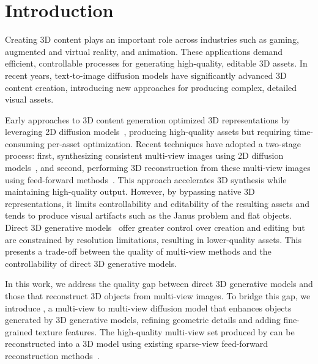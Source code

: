 \chapter{Introduction}
\label{chap:intro}


Creating 3D content plays an important role across industries such as gaming, augmented and virtual reality, and animation. These applications demand efficient, controllable processes for generating high-quality, editable 3D assets. In recent years, text-to-image diffusion models have significantly advanced 3D content creation, introducing new approaches for producing complex, detailed visual assets.

Early approaches to 3D content generation optimized 3D representations by leveraging 2D diffusion models~\cite{poole2022dreamfusion, wang2022scorejacobianchaininglifting}, producing high-quality assets but requiring time-consuming per-asset optimization. Recent techniques have adopted a two-stage process: first, synthesizing consistent multi-view images using 2D diffusion models~\cite{liu2023zero1to3, wang2023imagedream, shi2024mvdream, shi2023zero123singleimageconsistent, liu2023one2345, liu2023one2345++}, and second, performing 3D reconstruction from these multi-view images using feed-forward methods~\cite{instant3d2023, xu2024instantmesh}.
This approach accelerates 3D synthesis while maintaining high-quality output. However, by bypassing native 3D representations, it limits controllability and editability of the resulting assets and tends to produce visual artifacts such as the Janus problem and flat objects. Direct 3D generative models~\cite{jun2023shape, nichol2022pointe} offer greater control over creation and editing but are constrained by resolution limitations, resulting in lower-quality assets. This presents a trade-off between the quality of multi-view methods and the controllability of direct 3D generative models.



In this work, we address the quality gap between direct 3D generative models and those that reconstruct 3D objects from multi-view images. To bridge this gap, we introduce \emph{\ourname}, a multi-view to multi-view diffusion model that enhances objects generated by 3D generative models, refining geometric details and adding fine-grained texture features. The high-quality multi-view set produced by \ourname{} can be reconstructed into a 3D model using existing sparse-view feed-forward reconstruction methods~\cite{xu2024instantmesh, jin2024lvsmlargeviewsynthesis, hong2023lrm, zhuang2024gtr}.

